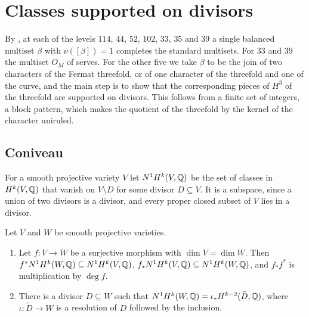 \section{Classes supported on divisors}\label{sec:classes}

By , at each of the levels $114$, $44$, $52$, $102$, $33$,
$35$ and $39$ a single balanced multiset $\beta$ with $\nu([\beta])=1$
completes the standard multisets. For $33$ and $39$ the multiset $O_{M}$ of
 serves. For the other five we take $\beta$ to be the join of
two characters of the Fermat threefold, or of one character of the threefold
and one of the curve, and the main step is to show that the corresponding
pieces of $H^{3}$ of the threefold are supported on divisors. This follows
from a finite set of integers, a block pattern, which makes the quotient of
the threefold by the kernel of the character uniruled.

\subsection{Coniveau}
For a smooth projective variety $V$ let $N^{1}H^{k}(V,\mathbb{Q})$ be the set of
classes in $H^{k}(V,\mathbb{Q})$ that vanish on $V\setminus D$ for some divisor
$D\subseteq V$. It is a subspace, since a union of two divisors is a
divisor, and every proper closed subset of $V$ lies in a divisor.

\begin{lemma}\label{lem:N1}
Let $V$ and $W$ be smooth projective varieties.
\begin{enumerate}[label=\textup{(\alph*)}]
\item Let $f\colon V\to W$ be a surjective morphism with $\dim V=\dim W$.
Then $f^{*}N^{1}H^{k}(W,\mathbb{Q})\subseteq N^{1}H^{k}(V,\mathbb{Q})$,
$f_{*}N^{1}H^{k}(V,\mathbb{Q})\subseteq N^{1}H^{k}(W,\mathbb{Q})$, and $f_{*}f^{*}$ is
multiplication by $\deg f$.
\item There is a divisor $D\subseteq W$ such that $N^{1}H^{k}(W,\mathbb{Q})=
\iota_{*}H^{k-2}(\tilde D,\mathbb{Q})$, where $\iota\colon\tilde D\to W$ is a
resolution of $D$ followed by the inclusion.
\end{enumerate}
\end{lemma}

